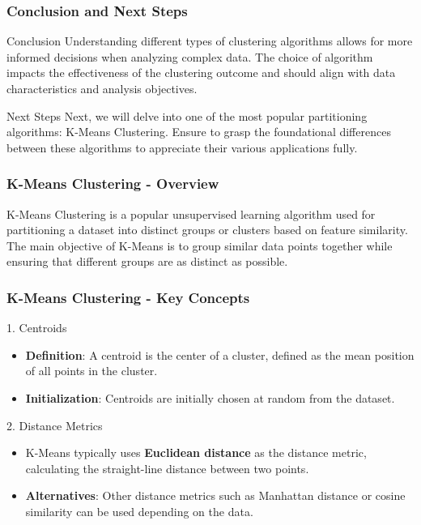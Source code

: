 \documentclass[aspectratio=169]{beamer}
\begin{document}
\begin{frame}[fragile]
    \frametitle{Conclusion and Next Steps}

    \begin{block}{Conclusion}
        Understanding different types of clustering algorithms allows for more informed decisions when analyzing complex data. The choice of algorithm impacts the effectiveness of the clustering outcome and should align with data characteristics and analysis objectives.
    \end{block}

    \begin{block}{Next Steps}
        Next, we will delve into one of the most popular partitioning algorithms: K-Means Clustering. Ensure to grasp the foundational differences between these algorithms to appreciate their various applications fully.
    \end{block}
\end{frame}

\begin{frame}[fragile]
    \frametitle{K-Means Clustering - Overview}
    K-Means Clustering is a popular unsupervised learning algorithm used for partitioning a dataset into distinct groups or clusters based on feature similarity. 
    The main objective of K-Means is to group similar data points together while ensuring that different groups are as distinct as possible.
\end{frame}

\begin{frame}[fragile]
    \frametitle{K-Means Clustering - Key Concepts}
    \begin{block}{1. Centroids}
        \begin{itemize}
            \item \textbf{Definition}: A centroid is the center of a cluster, defined as the mean position of all points in the cluster.
            \item \textbf{Initialization}: Centroids are initially chosen at random from the dataset.
        \end{itemize}
    \end{block}

    \begin{block}{2. Distance Metrics}
        \begin{itemize}
            \item K-Means typically uses \textbf{Euclidean distance} as the distance metric, calculating the straight-line distance between two points.
            \item \textbf{Alternatives}: Other distance metrics such as Manhattan distance or cosine similarity can be used depending on the data.
        \end{itemize}
    \end{block}
\end{frame}
\end{document}
